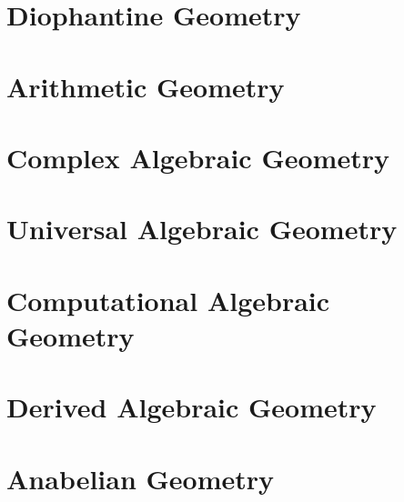\section{Diophantine Geometry}\label{sec:diophantine_geometry}

\section{Arithmetic Geometry}\label{sec:arithmetic_geometry}

\section{Complex Algebraic Geometry}
\label{sec:complex_algebraic_geometry}

\section{Universal Algebraic Geometry}\label{sec:universal_geometry}

\section{Computational Algebraic Geometry}
\label{sec:computational_algebraic_geometry}

\section{Derived Algebraic Geometry}
\label{sec:derived_algebraic_geometry}

\section{Anabelian Geometry}\label{sec:anabelian_geometry}


